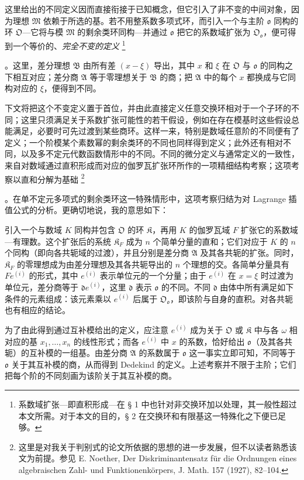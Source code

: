\documentclass[11pt]{article}
\providecommand{\srcfn}[2]{%
  \begingroup
  \renewcommand{\thefootnote}{#1}%
  \footnote{#2}%
  \addtocounter{footnote}{-1}%
  \endgroup}
\begin{document}
这里给出的不同定义因而直接衔接于已知概念，但它引入了非不变的中间对象，因为理想 \(\mathfrak M\) 依赖于所选的基。若不用整系数多项式环，而引入一个与主阶 \(\mathfrak o\) 同构的环 \(\mathfrak O\)---它将与模 \(\mathfrak M\) 的剩余类环同构---并通过 \(\mathfrak o\) 把它的系数域扩张为 \(\mathfrak O_{\mathfrak o}\)，便可得到一个等价的、\emph{完全不变的定义}\srcfn{2)}{系数域扩张---即直积形成---在 § 1 中也针对非交换环加以处理，其一般性超过本文所需。对于本文的目的，§ 2 在交换环和有限基这一特殊化之下便已足够。}。这里，差分理想 \(\mathfrak B\) 由所有差 \((x-\xi)\) 导出，其中 \(x\) 和 \(\xi\) 在 \(\mathfrak O\) 与 \(\mathfrak o\) 的同构之下相互对应；差分商 \(\mathfrak A\) 等于零理想关于 \(\mathfrak B\) 的商；把 \(\mathfrak A\) 中的每个 \(x\) 都换成与它同构对应的 \(\xi\)，便得到不同。

下文将把这个不变定义置于首位，并由此直接定义任意交换环相对于一个子环的不同；这里只须满足关于系数扩张可能性的若干假设，例如在存在模基时这些假设总能满足，必要时可先过渡到某些商环。这样一来，特别是数域任意阶的不同便有了定义；一个阶模某个素数幂的剩余类环的不同也同样得到定义；此外还有相对不同，以及多不定元代数函数情形中的不同。不同的微分定义与通常定义的一致性，来自对数域通过直积形成而对应的伽罗瓦扩张环所作的一项精细结构考察；这项考察以直和分解为基础\srcfn{3)}{这里是对我关于判别式的论文所依据的思想的进一步发展，但不以读者熟悉该文为前提。参见 E. Noether, Der Diskriminantensatz für die Ordnungen eines algebraischen Zahl- und Funktionenkörpers, J. Math. 157 (1927), 82--104.}。在单不定元多项式的剩余类环这一特殊情形中，这项考察归结为对 Lagrange 插值公式的分析。更确切地说，我的意思如下：

引入一个与数域 \(K\) 同构并包含 \(\mathfrak O\) 的环 \(\mathfrak K\)，再用 \(K\) 的伽罗瓦域 \(F\) 扩张它的系数域---有理数。这个扩张后的系统 \(\mathfrak K_F\) 成为 \(n\) 个简单分量的直和；它们对应于 \(K\) 的 \(n\) 个同构（即向各共轭域的过渡），并且分别是差分商 \(\mathfrak A\) 及其各共轭的扩张。同时，\(\mathfrak K_F\) 的零理想成为由差分理想及其各共轭导出的 \(n\) 个理想的交。各简单分量具有 \(Fe^{(i)}\) 的形式，其中 \(e^{(i)}\) 表示单位元的一个分量；由于 \(e^{(i)}\) 在 \(x=\xi\) 时过渡为单位元，差分商等于 \(\mathfrak d e^{(i)}\)，这里 \(\mathfrak d\) 表示 \(\mathfrak o\) 的不同。不同 \(\mathfrak d\) 由体中所有满足如下条件的元素组成：该元素乘以 \(e^{(i)}\) 后属于 \(\mathfrak O_{\mathfrak o}\)，即该阶与自身的直积。对各共轭也有相应的结论。

为了由此得到通过互补模给出的定义，应注意 \(e^{(i)}\) 成为关于 \(\mathfrak O\) 或 \(\mathfrak K\) 中与各 \(\omega\) 相对应的基 \(x_1,\ldots,x_n\) 的线性形式；而各 \(e^{(i)}\) 中 \(x\) 的系数，恰好给出 \(\mathfrak o\)（及其各共轭）的互补模的一组基。由差分商 \(\mathfrak A\) 的系数属于 \(\mathfrak o\) 这一事实立即可知，不同等于 \(\mathfrak o\) 关于其互补模的商，从而得到 Dedekind 的定义。上述考察并不限于主阶；它们把每个阶的不同刻画为该阶关于其互补模的商。
\end{document}
